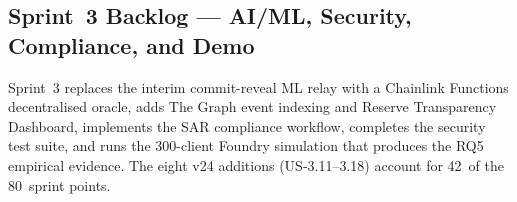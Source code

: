 \subsection{Sprint~3 Backlog --- AI/ML, Security, Compliance, and Demo}
\label{sec:sprint3}

Sprint~3 replaces the interim commit-reveal ML relay with a Chainlink
Functions decentralised oracle, adds The Graph event indexing and Reserve
Transparency Dashboard, implements the SAR compliance workflow, completes
the security test suite, and runs the 300-client Foundry simulation that
produces the RQ5 empirical evidence. The eight v24 additions (US-3.11--3.18)
account for 42~of the 80~sprint points.


